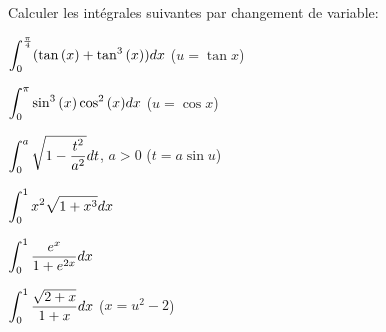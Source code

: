 \documentclass[a4paper, 11pt,reqno]{article}
\begin{document}
\begin{exercice}   \;
	Calculer les int\'egrales suivantes par changement de variable:
	\begin{enumerate}
		\begin{minipage}[t]{0.45\textwidth}
			\item $\displaystyle\int_{0}^{\frac{\pi}{4} } (\tan{(x)} +\tan^3{(x)}   ) dx$ \; ($u=\tan{x}$)\vsec
			\item $\displaystyle\int_{0}^{\pi} \sin^3{(x)}\cos^2{(x)} dx$ \; ($u=\cos{x}$)\vsec
			\item $\displaystyle\int_0^a \displaystyle\sqrt{1-\displaystyle\frac{t^2}{a^2}} dt$, $a>0$ \; ($t=a\sin{u}$)
		\end{minipage}
		\begin{minipage}[t]{0.45\textwidth}
			\item $\displaystyle\int_{0}^{1} x^2\sqrt{1+x^3} dx$\vsec
			\item $\displaystyle\int_0^1 \displaystyle\frac{e^x}{1+e^{2x}}dx$\vsec
			\item $\displaystyle\int_0^1 \displaystyle\frac{\sqrt{2+x}}{1+x} dx$ \; ($x=u^2-2$)
		\end{minipage}
	\end{enumerate}
\end{exercice}
\end{document}
